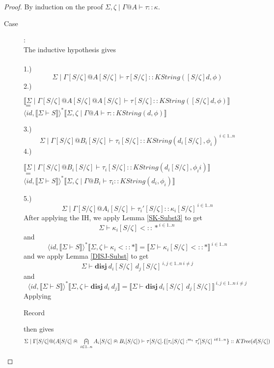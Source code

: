 \documentclass{article}
\newcommand{\mbf}{\mathbf}
\newcommand{\sem}[1]{\llbracket #1 \rrbracket}
\newcommand{\capdot}{~\stackinset{c}{}{c}{}{\scalebox{0.8}{$\ast$}}{$\cap$}~}
\newcommand{\bigcapdot}{\mathop{\stackinset{c}{}{c}{}{\scalebox{0.8}{$\ast$}}{$\bigcap$}}}
\begin{document}
\begin{proof}
By induction on the proof $\Sigma,\zeta \mid \Gamma @ A \vdash \tau :: \kappa$.

\begin{description}
\item[Case ]:~\\
The inductive hypothesis gives~\\~\\ 1.) $$\Sigma \mid \Gamma[S/\zeta] @ A[S/\zeta] \vdash \tau[S/\zeta] :: \mathit{KString}([S/\zeta]d,\phi)$$ 2.)
\begin{center}
$\sem{\Sigma \mid \Gamma[S/\zeta]@A[S/\zeta] @ A[S/\zeta] \vdash \tau[S/\zeta] :: KString([S/\zeta]d,\phi)}$\\$=$\\ 
$\langle \mathit{id}, \sem{\Sigma \vdash S} \rangle^* \sem{\Sigma,\zeta \mid \Gamma @ A \vdash \tau :: \mathit{KString}(d,\phi)}$
\end{center}
3.)\\
$$\Sigma \mid \Gamma[S/\zeta] @ B_i[S/\zeta] \vdash \tau_i[S/\zeta] :: \mathit{KString}(d_i[S/\zeta],\phi_i)^{~i \in 1..n}$$
4.)
\begin{center}
$\sem{\Sigma \mid \Gamma[S/\zeta] @ B_i[S/\zeta] \vdash \tau_i[S/\zeta] :: \mathit{KString}(d_i[S/\zeta],\phi_ii)}$\\
$=$\\ 
$\langle \mathit{id}, \sem{\Sigma \vdash S} \rangle^* \sem{\Sigma,\zeta \mid \Gamma @ B_i \vdash \tau_i :: \mathit{KString}(d_i,\phi_i)}$
\end{center}
5.)
$$\Sigma \mid \Gamma[S/\zeta ]@ A_i[S/\zeta] \vdash \tau_i'[S/\zeta] :: \kappa_i[S/\zeta]^{~i \in 1..n}$$
After applying the IH, we apply Lemma \ref{SK-Subst3} to get
$$\Sigma \vdash \kappa_i[S/\zeta] <:: \ast^{~i \in 1..n}$$ 
and
$$\langle \mathit{id}, \sem{\Sigma \vdash S} \rangle^* \sem{\Sigma,\zeta \vdash \kappa_i <:: \ast} = \sem{\Sigma \vdash \kappa_i[S/\zeta] <:: \ast}^{~i \in 1..n}$$
and we apply Lemma \ref{DISJ-Subst} to get $$\Sigma \vdash \mbf{disj}~d_i[S/\zeta]~d_j[S/\zeta]^{~i,j \in 1..n~i \neq j}$$
and
$$\langle \mathit{id}, \sem{\Sigma \vdash S} \rangle^* \sem{\Sigma,\zeta \vdash \mbf{disj}~d_i~d_j} = \sem{\Sigma \vdash \mbf{disj}~d_i[S/\zeta]~d_j[S/\zeta]}^{~i,j \in 1..n~i \neq j}$$ 
Applying \begin{sc}Record\end{sc} then gives 
$$\Sigma \mid \Gamma[S/\zeta] @ (A[S/\zeta] \capdot \bigcapdot_{i \in 1.. n} A_i[S/\zeta] \capdot B_i[S/\zeta]) \vdash \tau[S/\zeta].\{ [\tau_i[S/\zeta] :^{m_i} \tau_i'[S/\zeta]^{~i \in 1..n} \} :: \mathit{KTree}(d[S/\zeta])$$

\end{description}
\end{proof}
\end{document}
